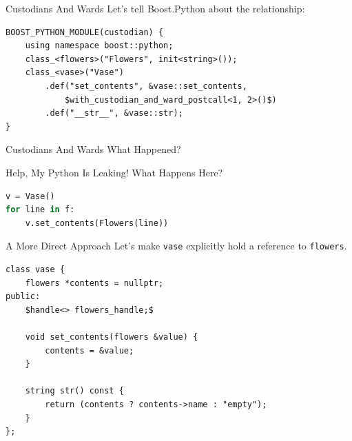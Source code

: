 \documentclass{beamer}
\def\linlinec{\lstinline[basicstyle=\ttfamily,language=c++]}
\begin{document}
\begin{frame}[fragile=singleslide]{Custodians And Wards}
  Let's tell Boost.Python about the relationship:
  \begin{lstlisting}[language={[extra]c++}]
BOOST_PYTHON_MODULE(custodian) {
    using namespace boost::python;
    class_<flowers>("Flowers", init<string>());
    class_<vase>("Vase")
        .def("set_contents", &vase::set_contents,
            $with_custodian_and_ward_postcall<1, 2>()$)
        .def("__str__", &vase::str);
}
  \end{lstlisting}
\end{frame}

\begin{frame}{Custodians And Wards}
  What Happened?

  \begin{figure}
  \end{figure}
\end{frame}

\begin{frame}[fragile=singleslide]{Help, My Python Is Leaking!}
  What Happens Here?
  \begin{lstlisting}[language=python]
v = Vase()
for line in f:
    v.set_contents(Flowers(line))
  \end{lstlisting}
\end{frame}

\begin{frame}[fragile=singleslide]{A More Direct Approach}
  Let's make \linlinec"vase" explicitly hold a reference to
  \linlinec"flowers".
  \begin{lstlisting}[language={[extra]c++}]
class vase {
    flowers *contents = nullptr;
public:
    $handle<> flowers_handle;$

    void set_contents(flowers &value) {
        contents = &value;
    }

    string str() const {
        return (contents ? contents->name : "empty");
    }
};
  \end{lstlisting}
\end{frame}
\end{document}
